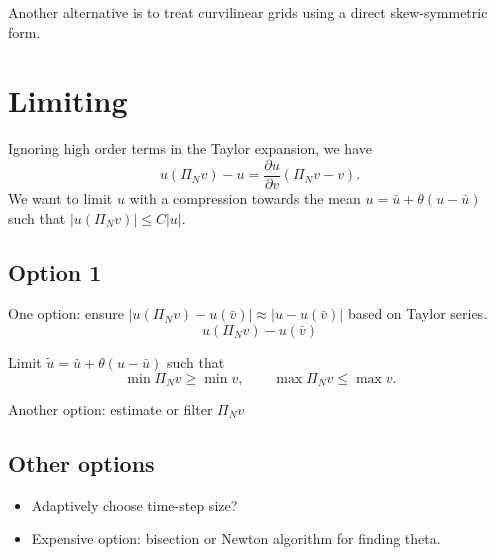 \documentclass[preprint,10pt]{article}
\theoremstyle{definition}
\theoremstyle{lemma}
\theoremstyle{theorem}
\theoremstyle{assumption}
\newcommand{\pd}[2]{\frac{\partial#1}{\partial#2}}
\newcommand{\LRp}[1]{\left( #1 \right)}
\newcommand{\LRb}[1]{\left| #1 \right|}
\begin{document}
Another alternative is to treat curvilinear grids using a direct skew-symmetric form.  

\section{Limiting}

Ignoring high order terms in the Taylor expansion, we have
\[
u\LRp{\Pi_N v} - u = \pd{u}{v} \LRp{\Pi_Nv - v}.
\]
We want to limit $u$ with a compression towards the mean $u = \bar{u} + \theta(u-\bar{u})$ such that $\LRb{u\LRp{\Pi_N v}} \leq C\LRb{u}$.  

\subsection{Option 1}

One option: ensure $\LRb{u\LRp{\Pi_N v} - u(\bar{v})} \approx \LRb{u - u(\bar{v})}$ based on Taylor series. 
\[
u\LRp{\Pi_N v} - u(\bar{v})
\]

Limit $\tilde{u} = \bar{u} + \theta(u-\bar{u})$ such that 
\[
\min \Pi_N v \geq \min v, \qquad \max \Pi_N v \leq \max v.
\]

Another option: estimate or filter $\Pi_N v$ 

\subsection{Other options}
\begin{itemize}
\item Adaptively choose time-step size?
\item Expensive option: bisection or Newton algorithm for finding theta.  
\end{itemize}





\end{document}
